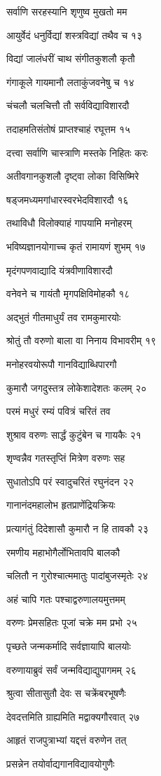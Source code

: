 सर्वाणि सरहस्यानि शृणुष्व मुखतो मम

आयुर्वेदं धनुर्विद्यां शस्त्रविद्यां तथैव च १३

विद्यां जालंधरीं चाथ संगीतकुशलौ कृतौ

गंगाकूले गायमानौ लताकुंजवनेषु च १४

चंचलौ चलचित्तौ तौ सर्वविद्याविशारदौ

तदाहमतिसंतोषं प्राप्तश्चाहं रघूत्तम १५

दत्त्वा सर्वाणि चास्त्राणि मस्तके निहितः करः

अतीवगानकुशलौ दृष्ट्वा लोका विसिष्मिरे

षड्जमध्यमगांधारस्वरभेदविशारदौ १६

तथाविधौ विलोक्याहं गापयामि मनोहरम्

भविष्यज्ञानयोगाच्च कृतं रामायणं शुभम् १७

मृदंगपणवाद्यादि यंत्रवीणाविशारदौ

वनेवने च गायंतौ मृगपक्षिविमोहकौ १८

अद्भुतं गीतमाधुर्यं तव रामकुमारयोः

श्रोतुं तौ वरुणो बाला वा निनाय विभावरीम् १९

मनोहरवयोरूपौ गानविद्याब्धिपारगौ

कुमारौ जगदुस्तत्र लोकेशादेशतः कलम् २०

परमं मधुरं रम्यं पवित्रं चरितं तव

शुश्राव वरुणः सार्द्धं कुटुंबेन च गायकैः २१

शृण्वन्नैव गतस्तृप्तिं मित्रेण वरुणः सह

सुधातोऽपि परं स्वादुचरितं रघुनंदन २२

गानानंदमहालोभ हृतप्राणेंद्रियक्रियः

प्रत्यागंतुं दिदेशासौ कुमारौ न हि तावकौ २३

रमणीय महाभोगैर्लोभितावपि बालकौ

चलितौ न गुरोश्चात्ममातुः पादांबुजस्मृतेः २४

अहं चापि गतः पश्चाद्वरुणालयमुत्तमम्

वरुणः प्रेमसहितः पूजां चक्रे मम प्रभो २५

पृच्छते जन्मकर्मादि सर्वज्ञायापि बालयोः

वरुणायाब्रुवं सर्वं जन्मविद्याद्युपागमम् २६

श्रुत्वा सीतासुतौ देवः स चक्रेंबरभूषणैः

देवदत्तमिति ग्राह्यमिति मद्वाक्यगौरवात् २७

आहृतं राजपुत्राभ्यां यद्दत्तं वरुणेन तत्

प्रसन्नेन तयोर्वाद्यगानविद्यावयोगुणैः

